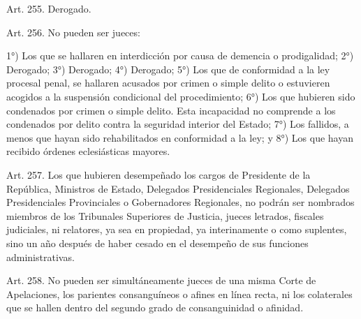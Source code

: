     Art. 255. Derogado.



    Art. 256. No pueden ser jueces:

    1°) Los que se hallaren en interdicción por causa de demencia o prodigalidad;
    2°) Derogado;
    3°) Derogado;
    4°) Derogado;
    5°) Los que de conformidad a la ley procesal penal, se hallaren acusados por crimen o simple delito o estuvieren acogidos a la suspensión condicional del procedimiento;
    6°) Los que hubieren sido condenados por crimen o simple delito.
    Esta incapacidad no comprende a los condenados por delito contra la seguridad interior del Estado;
    7°) Los fallidos, a menos que hayan sido rehabilitados en conformidad a la ley; y
    8°) Los que hayan recibido órdenes eclesiásticas mayores.




    Art. 257. Los que hubieren desempeñado los cargos de Presidente de la República, Ministros de Estado, Delegados Presidenciales Regionales, Delegados Presidenciales Provinciales o Gobernadores Regionales, no podrán ser nombrados miembros de los Tribunales Superiores de Justicia, jueces letrados, fiscales judiciales, ni relatores, ya sea en propiedad, ya interinamente o como suplentes, sino un año después de haber cesado en el desempeño de sus funciones administrativas.



    Art. 258. No pueden ser simultáneamente jueces de una misma Corte de Apelaciones, los parientes consanguíneos o afines en línea recta, ni los colaterales que se hallen dentro del segundo grado de consanguinidad o afinidad.

